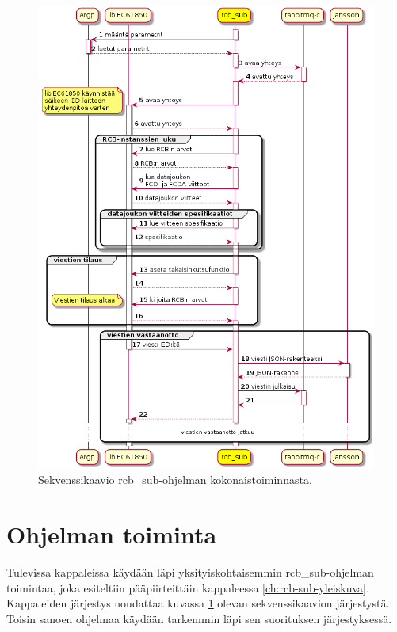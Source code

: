 \begin{figure}[ht!]
	\includegraphics[width=1\textwidth]{pictures/rcb-sub-general-sd.png}
	\caption{Sekvenssikaavio rcb\_sub-ohjelman kokonaistoiminnasta.}
	\label{fig:rcb-sub-sekvenssikaavio}
\end{figure}


\section{Ohjelman toiminta}
\label{rcb-sub-toiminta}
Tulevissa kappaleissa käydään läpi yksityiskohtaisemmin rcb\_sub-ohjelman toimintaa, joka esiteltiin pääpiirteittäin kappaleessa \ref{ch:rcb-sub-yleiskuva}. Kappaleiden järjestys noudattaa kuvassa \ref{fig:rcb-sub-sekvenssikaavio} olevan sekvenssikaavion järjestystä. Toisin sanoen ohjelmaa käydään tarkemmin läpi sen suorituksen järjestyksessä.


